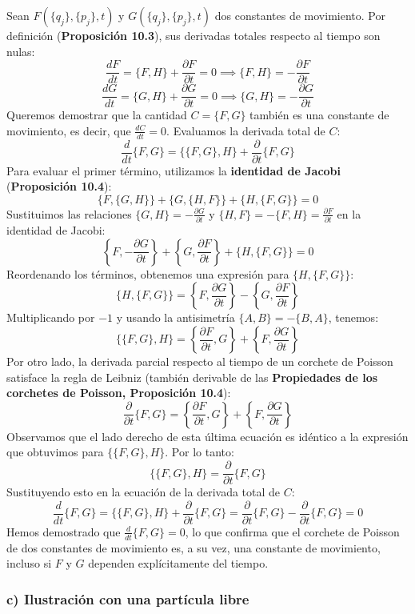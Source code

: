 \documentclass[a4paper]{article}
\begin{document}
Sean $F(\{q_j\}, \{p_j\}, t)$ y $G(\{q_j\}, \{p_j\}, t)$ dos constantes de movimiento. Por definición (\textbf{Proposición 10.3}), sus derivadas totales respecto al tiempo son nulas:
$$\frac{dF}{dt} = \{F, H\} + \frac{\partial F}{\partial t} = 0 \implies \{F, H\} = -\frac{\partial F}{\partial t}$$
$$\frac{dG}{dt} = \{G, H\} + \frac{\partial G}{\partial t} = 0 \implies \{G, H\} = -\frac{\partial G}{\partial t}$$
Queremos demostrar que la cantidad $C = \{F, G\}$ también es una constante de movimiento, es decir, que $\frac{dC}{dt} = 0$. Evaluamos la derivada total de $C$:
$$\frac{d}{dt}\{F, G\} = \{\{F, G\}, H\} + \frac{\partial}{\partial t}\{F, G\}$$
Para evaluar el primer término, utilizamos la \textbf{identidad de Jacobi} (\textbf{Proposición 10.4}):
$$\{F, \{G, H\}\} + \{G, \{H, F\}\} + \{H, \{F, G\}\} = 0$$
Sustituimos las relaciones $\{G, H\} = -\frac{\partial G}{\partial t}$ y $\{H, F\} = -\{F, H\} = \frac{\partial F}{\partial t}$ en la identidad de Jacobi:
$$\left\{F, -\frac{\partial G}{\partial t}\right\} + \left\{G, \frac{\partial F}{\partial t}\right\} + \{H, \{F, G\}\} = 0$$
Reordenando los términos, obtenemos una expresión para $\{H, \{F, G\}\}$:
$$\{H, \{F, G\}\} = \left\{F, \frac{\partial G}{\partial t}\right\} - \left\{G, \frac{\partial F}{\partial t}\right\}$$
Multiplicando por $-1$ y usando la antisimetría $\{A, B\} = -\{B, A\}$, tenemos:
$$\{\{F, G\}, H\} = \left\{\frac{\partial F}{\partial t}, G\right\} + \left\{F, \frac{\partial G}{\partial t}\right\}$$
Por otro lado, la derivada parcial respecto al tiempo de un corchete de Poisson satisface la regla de Leibniz (también derivable de las \textbf{Propiedades de los corchetes de Poisson, Proposición 10.4}):
$$\frac{\partial}{\partial t}\{F, G\} = \left\{\frac{\partial F}{\partial t}, G\right\} + \left\{F, \frac{\partial G}{\partial t}\right\}$$
Observamos que el lado derecho de esta última ecuación es idéntico a la expresión que obtuvimos para $\{\{F, G\}, H\}$. Por lo tanto:
$$\{\{F, G\}, H\} = \frac{\partial}{\partial t}\{F, G\}$$
Sustituyendo esto en la ecuación de la derivada total de $C$:
$$\frac{d}{dt}\{F, G\} = \{\{F, G\}, H\} + \frac{\partial}{\partial t}\{F, G\} = \frac{\partial}{\partial t}\{F, G\} - \frac{\partial}{\partial t}\{F, G\} = 0$$
Hemos demostrado que $\frac{d}{dt}\{F, G\} = 0$, lo que confirma que el corchete de Poisson de dos constantes de movimiento es, a su vez, una constante de movimiento, incluso si $F$ y $G$ dependen explícitamente del tiempo.

\subsubsection*{c) Ilustración con una partícula libre}
\end{document}
